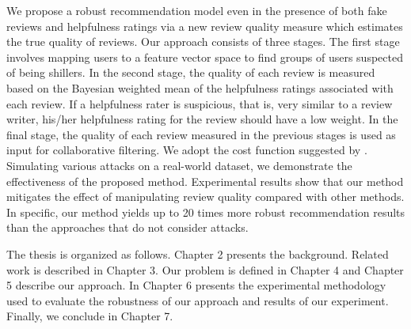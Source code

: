 \documentclass[master,english,final]{kaist-ucs}
\begin{document}
We propose a robust recommendation model even in the presence of both fake reviews and helpfulness ratings via a new review quality measure which estimates the true quality of reviews.
Our approach consists of three stages.
The first stage involves mapping users to a feature vector space to find groups of users suspected of being shillers.
In the second stage, the quality of each review is measured based on the Bayesian weighted mean of the helpfulness ratings associated with each review.
If a helpfulness rater is suspicious, that is, very similar to a review writer, his/her helpfulness rating for the review should have a low weight.
In the final stage, the quality of each review measured in the previous stages is used as input for collaborative filtering.
We adopt the cost function suggested by \cite{ImplicitCF,RQMF}.
Simulating various attacks on a real-world dataset, we demonstrate the effectiveness of the proposed method.
Experimental results show that our method mitigates the effect of manipulating review quality compared with other methods.
In specific, our method yields up to 20 times more robust recommendation results than the approaches that do not consider attacks.

The thesis is organized as follows.
Chapter 2 presents the background.
Related work is described in Chapter 3.
Our problem is defined in Chapter 4 and Chapter 5 describe our approach.
In Chapter 6 presents the experimental methodology used to evaluate the robustness of our approach and results of our experiment.
Finally, we conclude in Chapter 7.
\end{document}
